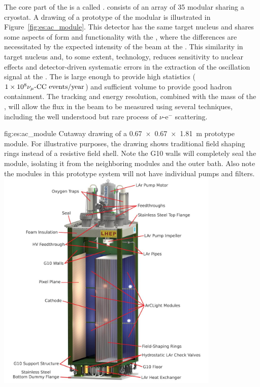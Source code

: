 The core part of the   is a  called .   consists of an array of 35 modular  sharing a cryostat.  A drawing of a prototype of the modular  is illustrated in Figure~\ref{fig:es:ac_module}.  %
This detector has the same target nucleus and shares some aspects of form and functionality with the , where the differences are necessitated by the expected intensity of the beam at the .  This similarity in target nucleus and, to some extent, technology, reduces sensitivity to nuclear effects and detector-driven systematic errors in the extraction of the oscillation signal at the  .  The  is large enough to provide high statistics ($\num{1e8}{\numu \text{-CC events/year}}$) and sufficient volume to provide good hadron containment.  The tracking and energy resolution, combined with the mass of the , will allow the flux in the beam to be measured using several techniques, including the well understood but rare process of $\nu$-e$^{-}$ scattering.

\begin{dunefigure}{fig:es:ac_module}
{Cutaway drawing of a \SI{0.67 x 0.67 x 1.81}{\metre}  prototype module. For illustrative purposes, the drawing shows traditional field shaping rings instead of a resistive field shell. Note the G10 walls will completely seal the module, isolating it from the neighboring modules and the outer  bath. Also note the modules in this prototype system will not have individual pumps and filters.}
\includegraphics[width=0.8\textwidth]{graphics/Normal-Module-4K_labelled.jpeg}
\end{dunefigure}

